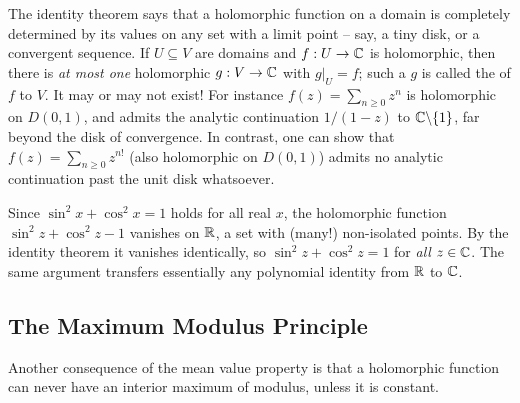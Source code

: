 \documentclass[a4paper]{scrartcl}
\begin{document}
\begin{remark}
    The identity theorem says that a holomorphic function on a domain is completely determined by its values on any set with a limit point -- say, a tiny disk, or a convergent sequence. If $U \subseteq V$ are domains and $f: U \rightarrow \mathbb{C}$ is holomorphic, then there is \emph{at most one} holomorphic $g: V \rightarrow \mathbb{C}$ with $g|_U = f$; such a $g$ is called the  of $f$ to $V$. It may or may not exist! For instance $f(z) = \sum_{n \geq 0} z^n$ is holomorphic on $D(0, 1)$, and admits the analytic continuation $1/(1 - z)$ to $\mathbb{C} \backslash \{1\}$, far beyond the disk of convergence. In contrast, one can show that $f(z) = \sum_{n \geq 0} z^{n!}$ (also holomorphic on $D(0, 1)$) admits no analytic continuation past the unit disk whatsoever.
\end{remark}

\begin{example}
    Since $\sin^2 x + \cos^2 x = 1$ holds for all real $x$, the holomorphic function $\sin^2 z + \cos^2 z - 1$ vanishes on $\mathbb{R}$, a set with (many!) non-isolated points. By the identity theorem it vanishes identically, so $\sin^2 z + \cos^2 z = 1$ for \emph{all} $z \in \mathbb{C}$. The same argument transfers essentially any polynomial identity from $\mathbb{R}$ to $\mathbb{C}$.
\end{example}

\subsection{The Maximum Modulus Principle}

Another consequence of the mean value property is that a holomorphic function can never have an interior maximum of modulus, unless it is constant.
\end{document}

